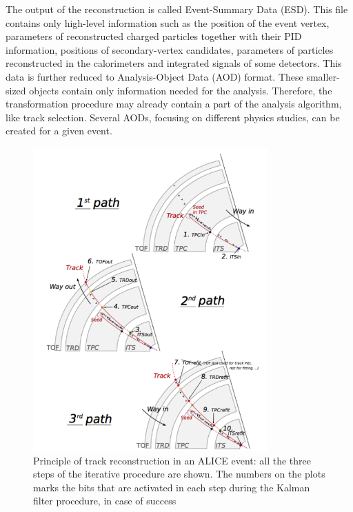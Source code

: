 The output of the reconstruction is called Event-Summary Data (ESD). This file contains only high-level information such as the position of the event vertex, parameters of reconstructed charged particles together with their PID information, positions of secondary-vertex candidates, parameters of particles reconstructed in the calorimeters and integrated signals of some detectors. This data is further reduced to Analysis-Object Data (AOD) format. These smaller-sized objects contain only information needed for the analysis. Therefore, the transformation procedure may already contain a part of the analysis algorithm, like track selection. Several AODs, focusing on different physics studies, can be created for a given event.


\begin{figure}[t]
\centering
\includegraphics[width=0.8\textwidth]{Images/Chapter3/track_recon}
\caption[ALICE track reconstruction principle]{Principle of track reconstruction in an ALICE event: all the three steps of the iterative procedure are shown. The numbers on the plots marks the bits that are activated in each step during the Kalman filter procedure, in case of success}
\label{Fig:cap3-1.13}
\end{figure}


